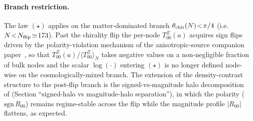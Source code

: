 \paragraph{Branch restriction.}
The law $(\star)$ applies on the matter-dominated branch
$\theta_{\rm chir}(N)\!<\!\pi/4$ (i.e.\ $N\!<\!N_{\rm flip}\!\simeq\!173$).
Past the chirality flip the per-node $T_{00}^{\Xi}(a)$
acquires sign flips driven by the polarity-violation mechanism
of the anisotropic-source companion paper~\cite{Paper4B}, so
that $T_{00}^{\Xi}(a)/\langle T_{00}^{\Xi}\rangle_{N}$ takes
negative values on a non-negligible fraction of bulk nodes
and the scalar $\log(\cdot)$ entering $(\star)$ is no longer
defined node-wise on the cosmologically-mixed branch. The
extension of the density-contrast structure to the post-flip
branch is the signed-vs-magnitude halo decomposition of
\cite{Paper4B} (Section ``signed-halo vs magnitude-halo
separation''), in which the polarity ($\mathrm{sgn}\,R_{00}$)
remains regime-stable across the flip while the magnitude
profile $|R_{00}|$ flattens, as expected.

